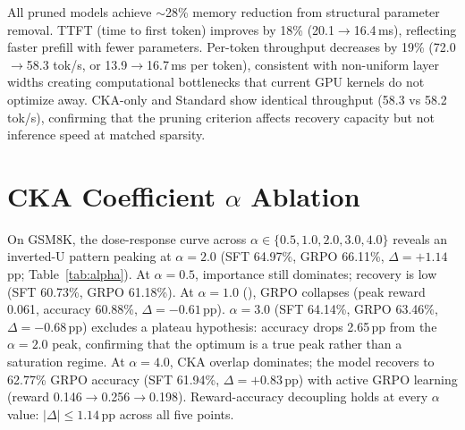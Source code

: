 \begin{table}[h]
\centering
\small
\caption{Inference characteristics at 20\% sparsity (single-GPU, no contention). Pruning reduces parameters by 19\% and memory by ${\sim}$28\%, with TTFT improving 18\%. Per-token throughput decreases 19\% (0.81$\times$) due to non-uniform layer widths from full-layer removal that current GPU kernels do not optimize.}
\label{tab:inference}
\end{table}

All pruned models achieve ${\sim}$28\% memory reduction from structural parameter removal.
TTFT (time to first token) improves by 18\% (20.1$\to$16.4\,ms), reflecting faster prefill with fewer parameters.
Per-token throughput decreases by 19\% (72.0$\to$58.3 tok/s, or 13.9$\to$16.7\,ms per token), consistent with non-uniform layer widths creating computational bottlenecks that current GPU kernels do not optimize away.
CKA-only and Standard show identical throughput (58.3 vs 58.2 tok/s), confirming that the pruning criterion affects recovery capacity but not inference speed at matched sparsity.

\section{CKA Coefficient $\alpha$ Ablation}
\label{sec:appendix_alpha}



On GSM8K, the dose-response curve across $\alpha \in \{0.5, 1.0, 2.0, 3.0, 4.0\}$ reveals an inverted-U pattern peaking at $\alpha{=}2.0$ (SFT 64.97\%, GRPO 66.11\%, $\Delta{=}{+}1.14$\,pp; Table~\ref{tab:alpha}).
At $\alpha{=}0.5$, importance still dominates; recovery is low (SFT 60.73\%, GRPO 61.18\%).
At $\alpha{=}1.0$ (\rasp{}), GRPO collapses (peak reward 0.061, accuracy 60.88\%, $\Delta{=}{-}0.61$\,pp).
$\alpha{=}3.0$ (SFT 64.14\%, GRPO 63.46\%, $\Delta{=}{-}0.68$\,pp) excludes a plateau hypothesis: accuracy drops 2.65\,pp from the $\alpha{=}2.0$ peak, confirming that the optimum is a true peak rather than a saturation regime.
At $\alpha{=}4.0$, CKA overlap dominates; the model recovers to 62.77\% GRPO accuracy (SFT 61.94\%, $\Delta{=}{+}0.83$\,pp) with active GRPO learning (reward 0.146$\to$0.256$\to$0.198).
Reward-accuracy decoupling holds at every $\alpha$ value: $|\Delta| \leq 1.14$\,pp across all five points.

